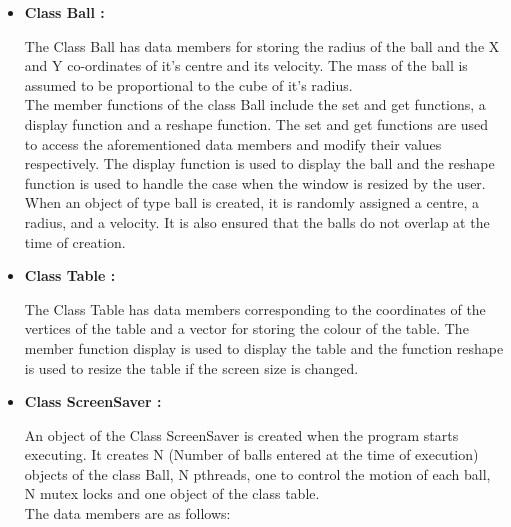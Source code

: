\documentclass[]{article}
\begin{document}
\begin{itemize}

\item \textbf{Class Ball :}

\begin{flushleft}

The Class Ball has data members for storing the radius of the ball and the X and Y co-ordinates of it's centre and its velocity. The mass of the ball is assumed to be proportional to the cube of it's radius. 
\\
The member functions of the class Ball include the set and get functions, a display function and a reshape function. The set and get functions are used to access the aforementioned data members and modify their values respectively. The display function is used to display the ball and the reshape function is used to handle the case when the window is resized by the user.
\\ 
When an object of type ball is created, it is randomly assigned a centre, a radius, and a velocity. It is also ensured that the balls do not overlap at the time of creation.
\end{flushleft}


\item \textbf{Class Table :}

\begin{flushleft}

The Class Table has data members corresponding to the coordinates of the vertices of the table and a vector for storing the colour of the table. The member function display is used to display the table and the function reshape is used to resize the table if the screen size is changed.  

\end{flushleft}


\item \textbf{Class ScreenSaver :}

\begin{flushleft}

An object of the Class ScreenSaver is created when the program starts executing. It creates N (Number of balls entered at the time of execution) objects of the class Ball, N pthreads, one to control the motion of each ball, N mutex locks and one object of the class table. \\

The data members are as follows: \\

\begin{enumerate}


\end{enumerate}
\end{flushleft}
\end{itemize}
\end{document}
